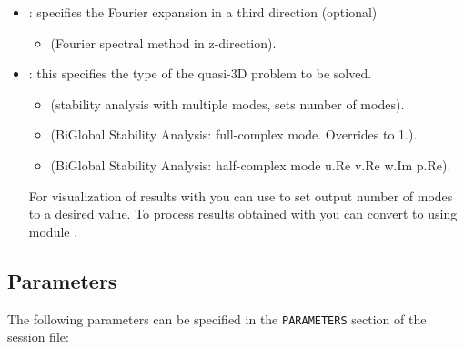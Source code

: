 \begin{itemize}
\item {}: specifies the Fourier expansion in a third direction (optional)
\begin{itemize}
    \item {} (Fourier spectral method in z-direction).
    \end{itemize}
    \item {}: this specifies the type of the quasi-3D problem to be solved.
\begin{itemize}
\item {} (stability analysis with multiple modes,  sets number of modes).
\item {} (BiGlobal Stability Analysis: full-complex mode. Overrides  to 1.).
\item {} (BiGlobal Stability Analysis: half-complex mode u.Re v.Re w.Im p.Re).
\end{itemize}
\begin{notebox}
  For visualization of  results with  you can use  to set output number of modes to a desired value.
  To process results obtained with  you can convert to  using  module .
\end{notebox}
\end{itemize}


\subsection{Parameters}
The following parameters can be specified in the \texttt{PARAMETERS} section of the session file:

